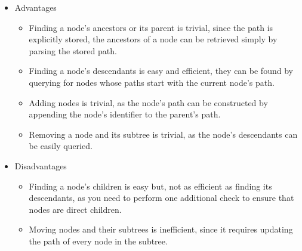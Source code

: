 \begin{itemize}
    \begin{itemize}
      \item Advantages
        \begin{itemize}
        \item Finding a node’s ancestors or its parent is trivial, since the path is explicitly stored,
          the ancestors of a node can be retrieved simply by parsing the stored path.
        \item Finding a node’s descendants is easy and efficient, they can be found by
          querying for nodes whose paths start with the current node's path.
        \item Adding nodes is trivial, as the node's path can be constructed by appending
          the node's identifier to the parent's path.
        \item Removing a node and its subtree is trivial, as the node's descendants can be
          easily queried.
      \end{itemize}
      \item Disadvantages
        \begin{itemize}
          \item Finding a node's children is easy but, not as efficient as finding its
            descendants, as you need to perform one additional check to ensure that nodes
            are direct children.
        \item Moving nodes and their subtrees is inefficient, since it requires updating
          the path of every node in the subtree. 
        \end{itemize}
    \end{itemize}
\end{itemize}


\newcommand{\goodcomplexity}[1]{\vspace{.4em}\textcolor{darkgreen}{\checkmark}\vspace{.4em}}
\newcommand{\mediumcomplexity}[1]{\vspace{.4em}\textcolor{orange}{\textcircled{}}\vspace{.4em}}
\newcommand{\badcomplexity}[1]{\vspace{.4em}\textcolor{red}{X}\vspace{.4em}}

